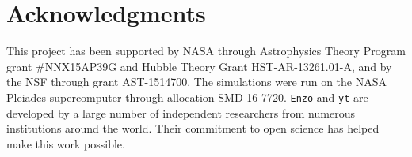 \documentclass[iop,apjl, twocolappendix]{emulateapj}   %
\begin{document}
\acknowledgments
\section{Acknowledgments}
\label{sec:acknowledgments}
This project has been supported by NASA through Astrophysics Theory Program
grant \#NNX15AP39G and Hubble Theory Grant HST-AR-13261.01-A, and by the
NSF through grant AST-1514700.  The simulations were run on the NASA
Pleiades supercomputer through allocation SMD-16-7720.  \texttt{Enzo} and
\texttt{yt} are developed by a large number of independent researchers from
numerous institutions around the world. Their commitment to open science
has helped make this work possible.

%



\end{document}
